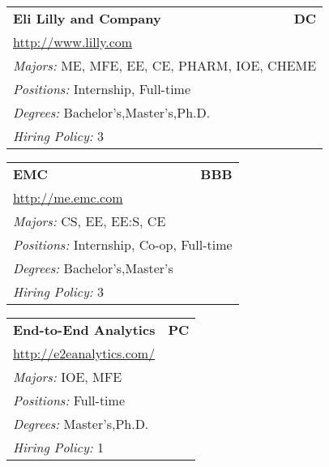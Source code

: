 \documentclass[twoside]{article}
\begin{document}
\begin{center}
\begin{multicols}{3}
\begin{FlushLeft}
\begin{minipage}{\columnwidth}
\end{minipage}
 
\begin{minipage}{\columnwidth}\begin{tabularx}{.95\columnwidth}{Xr}
                 {\Large\bf Eli Lilly and Company} & {\Large\bf DC}\\
    \multicolumn{2}{p{.95\columnwidth}}{\url{http://www.lilly.com}}\\
    \multicolumn{2}{p{.95\columnwidth}}{\emph{Majors:} ME, MFE, EE, CE, PHARM, IOE, CHEME}\\
    \multicolumn{2}{p{.95\columnwidth}}{\emph{Positions:} Internship, Full-time}\\
    \multicolumn{2}{p{.95\columnwidth}}{\emph{Degrees:} Bachelor's,Master's,Ph.D.}\\
    \multicolumn{2}{p{.95\columnwidth}}{\emph{Hiring Policy:} 3}\\
    \end{tabularx}
    
\end{minipage}
 
\begin{minipage}{\columnwidth}\begin{tabularx}{.95\columnwidth}{Xr}
                 {\Large\bf EMC} & {\Large\bf BBB}\\
    \multicolumn{2}{p{.95\columnwidth}}{\url{http://me.emc.com}}\\
    \multicolumn{2}{p{.95\columnwidth}}{\emph{Majors:} CS, EE, EE:S, CE}\\
    \multicolumn{2}{p{.95\columnwidth}}{\emph{Positions:} Internship, Co-op, Full-time}\\
    \multicolumn{2}{p{.95\columnwidth}}{\emph{Degrees:} Bachelor's,Master's}\\
    \multicolumn{2}{p{.95\columnwidth}}{\emph{Hiring Policy:} 3}\\
    \end{tabularx}
    
\end{minipage}
 
\begin{minipage}{\columnwidth}\begin{tabularx}{.95\columnwidth}{Xr}
                 {\Large\bf End-to-End Analytics} & {\Large\bf PC}\\
    \multicolumn{2}{p{.95\columnwidth}}{\url{http://e2eanalytics.com/}}\\
    \multicolumn{2}{p{.95\columnwidth}}{\emph{Majors:} IOE, MFE}\\
    \multicolumn{2}{p{.95\columnwidth}}{\emph{Positions:} Full-time}\\
    \multicolumn{2}{p{.95\columnwidth}}{\emph{Degrees:} Master's,Ph.D.}\\
    \multicolumn{2}{p{.95\columnwidth}}{\emph{Hiring Policy:} 1}\\
    \end{tabularx}
    

\end{minipage}
\end{FlushLeft}
\end{multicols}
\end{center}
\end{document}

